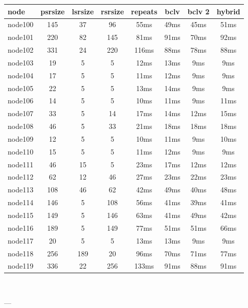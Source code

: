 \begin{tabular}{|l|c|c|c|c|c|c|c|}
\hline node & psrsize & lsrsize & rsrsize   & repeats & bclv & bclv 2 & hybrid\\
    \hline node100 & 145 & 37 & 96 & 55ms & 49ms & 45ms & 51ms\\
    \hline node101 & 220 & 82 & 145 & 81ms & 91ms & 70ms & 92ms\\
    \hline node102 & 331 & 24 & 220 & 116ms & 88ms & 78ms & 88ms\\
    \hline node103 & 19 & 5 & 5 & 12ms & 13ms & 9ms & 9ms\\
    \hline node104 & 17 & 5 & 5 & 11ms & 12ms & 9ms & 9ms\\
    \hline node105 & 22 & 5 & 5 & 13ms & 14ms & 9ms & 9ms\\
    \hline node106 & 14 & 5 & 5 & 10ms & 11ms & 9ms & 11ms\\
    \hline node107 & 33 & 5 & 14 & 17ms & 14ms & 12ms & 15ms\\
    \hline node108 & 46 & 5 & 33 & 21ms & 18ms & 18ms & 18ms\\
    \hline node109 & 12 & 5 & 5 & 10ms & 11ms & 9ms & 10ms\\
    \hline node110 & 15 & 5 & 5 & 11ms & 12ms & 9ms & 9ms\\
    \hline node111 & 46 & 15 & 5 & 23ms & 17ms & 12ms & 12ms\\
    \hline node112 & 62 & 12 & 46 & 27ms & 23ms & 22ms & 23ms\\
    \hline node113 & 108 & 46 & 62 & 42ms & 49ms & 40ms & 48ms\\
    \hline node114 & 146 & 5 & 108 & 56ms & 41ms & 39ms & 41ms\\
    \hline node115 & 149 & 5 & 146 & 63ms & 41ms & 49ms & 42ms\\
    \hline node116 & 189 & 5 & 149 & 77ms & 51ms & 51ms & 66ms\\
    \hline node117 & 20 & 5 & 5 & 13ms & 13ms & 9ms & 9ms\\
    \hline node118 & 256 & 189 & 20 & 96ms & 70ms & 71ms & 77ms\\
    \hline node119 & 336 & 22 & 256 & 133ms & 91ms & 88ms & 91ms\\

\hline
\end{tabular} \

---


